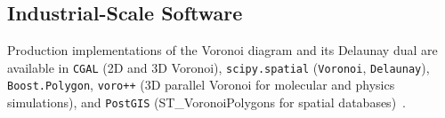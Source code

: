 \subsection{Industrial-Scale Software}
Production implementations of the Voronoi diagram and its Delaunay dual are
available in \texttt{CGAL} (2D and 3D Voronoi), \texttt{scipy.spatial}
(\texttt{Voronoi}, \texttt{Delaunay}), \texttt{Boost.Polygon},
\texttt{voro++} (3D parallel Voronoi for molecular and physics
simulations), and \texttt{PostGIS} (ST\_VoronoiPolygons for spatial
databases)~\cite{aurenhammer1991,okabe2000}.

